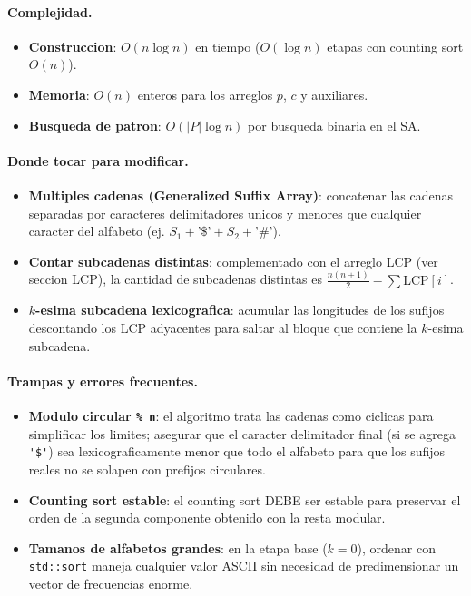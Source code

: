 \paragraph{Complejidad.}
\begin{itemize}\setlength\itemsep{0pt}
	\item \textbf{Construccion}: $O(n \log n)$ en tiempo ($O(\log n)$ etapas con counting sort $O(n)$).
	\item \textbf{Memoria}: $O(n)$ enteros para los arreglos $p$, $c$ y auxiliares.
	\item \textbf{Busqueda de patron}: $O(|P| \log n)$ por busqueda binaria en el SA.
\end{itemize}

\paragraph{Donde tocar para modificar.}
\begin{itemize}\setlength\itemsep{0pt}
	\item \textbf{Multiples cadenas (Generalized Suffix Array)}: concatenar las cadenas separadas por caracteres delimitadores unicos y menores que cualquier caracter del alfabeto (ej. $S_1 + \text{'\$'} + S_2 + \text{'\#'}$).
	\item \textbf{Contar subcadenas distintas}: complementado con el arreglo LCP (ver seccion LCP), la cantidad de subcadenas distintas es $\frac{n(n+1)}{2} - \sum \text{LCP}[i]$.
	\item \textbf{$k$-esima subcadena lexicografica}: acumular las longitudes de los sufijos descontando los LCP adyacentes para saltar al bloque que contiene la $k$-esima subcadena.
\end{itemize}

\paragraph{Trampas y errores frecuentes.}
\begin{itemize}\setlength\itemsep{0pt}
	\item \textbf{Modulo circular \texttt{\% n}}: el algoritmo trata las cadenas como ciclicas para simplificar los limites; asegurar que el caracter delimitador final (si se agrega \verb|'$'|) sea lexicograficamente menor que todo el alfabeto para que los sufijos reales no se solapen con prefijos circulares.
	\item \textbf{Counting sort estable}: el counting sort DEBE ser estable para preservar el orden de la segunda componente obtenido con la resta modular.
	\item \textbf{Tamanos de alfabetos grandes}: en la etapa base ($k=0$), ordenar con \verb|std::sort| maneja cualquier valor ASCII sin necesidad de predimensionar un vector de frecuencias enorme.
\end{itemize}

